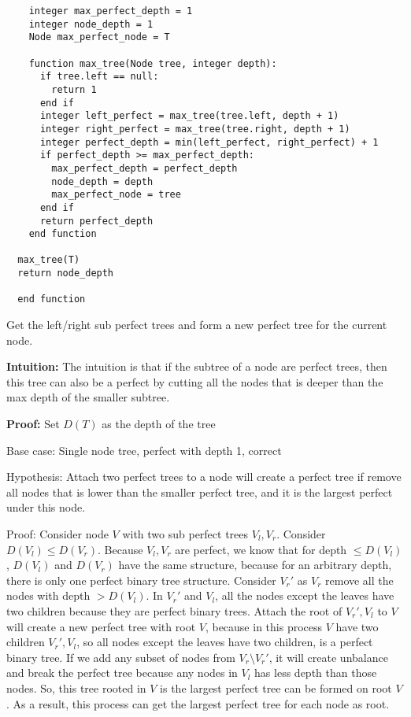 \documentclass{article}
\begin{document}
\begin{enumerate}[topsep=0pt]
\begin{verbatim}
    integer max_perfect_depth = 1
    integer node_depth = 1
    Node max_perfect_node = T

    function max_tree(Node tree, integer depth):
      if tree.left == null:
        return 1
      end if
      integer left_perfect = max_tree(tree.left, depth + 1)
      integer right_perfect = max_tree(tree.right, depth + 1)
      integer perfect_depth = min(left_perfect, right_perfect) + 1
      if perfect_depth >= max_perfect_depth:
        max_perfect_depth = perfect_depth
        node_depth = depth
        max_perfect_node = tree
      end if
      return perfect_depth
    end function

  max_tree(T)
  return node_depth

  end function
\end{verbatim}

Get the left/right sub perfect trees and form a new perfect tree for the current node.

\textbf{Intuition:}
The intuition is that if the subtree of a node are perfect trees, then this tree can also be a perfect by cutting all the nodes that is deeper than the max depth of the smaller subtree.

\textbf{Proof:}
Set $D(T)$ as the depth of the tree

Base case: Single node tree, perfect with depth 1, correct

Hypothesis: Attach two perfect trees to a node will create a perfect tree if remove all nodes that is lower than the smaller perfect tree,
and it is the largest perfect under this node.

Proof: Consider node $V$ with two sub perfect trees $V_l,V_r$. Consider $D(V_l)\leq D(V_r)$. Because $V_l,V_r$ are perfect, 
we know that for depth $\leq D(V_l)$, $D(V_l)$ and $D(V_r)$ have the same structure, because for an arbitrary depth, there is only one perfect binary tree structure.
Consider $V_r'$ as $V_r$ remove all the nodes with depth $>D(V_l)$. In $V_r'$ and $V_l$, all the nodes except the leaves have two children because they are perfect binary trees.
Attach the root of $V_r',V_l$ to $V$ will create a new perfect tree with root $V$, 
because in this process $V$ have two children $V_r',V_l$, so all nodes except the leaves have two children, is a perfect binary tree.
If we add any subset of nodes from $V_r\setminus V_r'$, it will create unbalance and break the perfect tree because any nodes in $V_l$ has less depth than those nodes.
So, this tree rooted in $V$ is the largest perfect tree can be formed on root $V$.
As a result, this process can get the largest perfect tree for each node as root.


\end{enumerate}
\end{document}
